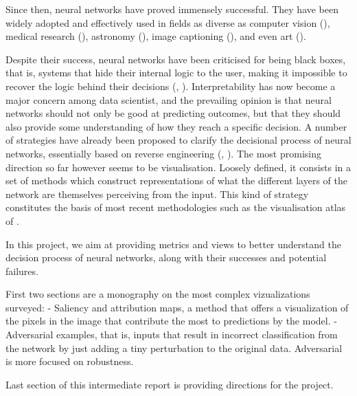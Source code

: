 Since then, neural networks have proved immensely successful. They have been widely adopted and effectively used in fields as diverse as computer vision (\cite{Szegedy2015}), medical research (\cite{Levy2016}), astronomy (\cite{Dieleman2014}), image captioning (\cite{Karpathy2015}), and even art (\cite{Gatys2016}).


Despite their success, neural networks have been criticised for being  black boxes, that is, systems that hide their internal logic to the user, making it impossible to recover the logic behind their decisions (\cite{Benitez1997}, \cite{Alain2016}). Interpretability has now become a major concern among data scientist, and the prevailing opinion is that neural networks should not only be good at predicting outcomes, but that they should also provide some understanding of how they reach a specific decision. A number of strategies have already been proposed to clarify the decisional process of neural networks, essentially based on reverse engineering (\cite{Oh2017}, \cite{Roxlo2018}). The most promising direction so far however seems to be visualisation. Loosely defined, it consists in a set of methods which construct representations of what the different layers of the network are themselves perceiving from the input. This kind of strategy constitutes the basis of most recent methodologies such as the visualisation atlas of \cite{Carter2019}.


In this project, we aim at providing metrics and views to better understand the decision process of neural networks, along with their successes and potential failures. 

First two sections are a monography on the most complex vizualizations surveyed: 
- Saliency and attribution maps, a method that offers a visualization of the pixels in the image that contribute the most to predictions by the model. 
- Adversarial examples, that is, inputs that result in incorrect classification from the network by just adding a tiny perturbation to the original data. Adversarial is more focused on robustness.

Last section of this intermediate report is providing directions for the project.
